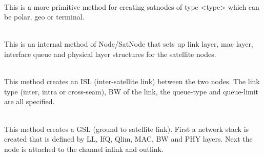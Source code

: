 \begin{flushleft}
\\
This is a more primitive method for creating satnodes of type <type>
which can be polar, geo or terminal. 


\\
This is an internal method of Node/SatNode that sets up link layer, mac
layer, interface queue and physical layer structures for the satellite
nodes.


\\
This method creates an ISL (inter-satellite link) between the two nodes.
The link type (inter, intra or cross-seam), BW of the link, the queue-type
and queue-limit are all specified.


\\
This method creates a GSL (ground to satellite link). First a network
stack is created that is defined by LL, IfQ, Qlim, MAC, BW and PHY layers.
Next the node is attached to the channel inlink and outlink.


\end{flushleft}

\endinput


